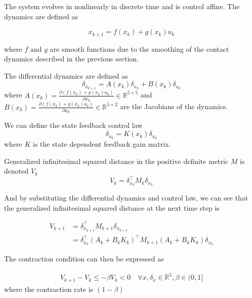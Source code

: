 \documentclass[journal]{IEEEtran}
\begin{document}
The system evolves in nonlinearly in discrete time and is control affine. The dynamics are defined as

\begin{equation}
    x_{k+1} = f(x_k) + g(x_k)u_k
\end{equation}

where $f$ and $g$ are smooth functions due to the smoothing of the contact dynamics described in the previous section.

The differential dynamics are defined as
\begin{equation}
    \delta_{x_{k+1}} = A(x_k)\delta_{x_k} + B(x_k)\delta_{u_k}
\end{equation}
where $A(x_k) = \frac{\partial (f(x_k) + g(x_k)u_k)}{\partial x_k} \in \mathbb{R}^{5 \times 5}$ and $B(x_k) = \frac{\partial (f(x_k) + g(x_k)u_k)}{\partial u_k} \in \mathbb{R}^{5 \times 2}$ are the Jacobians of the dynamics.

We can define the state feedback control law
\begin{equation}
	\label{eq:delta_control_law}
    \delta_{u_k} = K(x_k)\delta_{x_k}
\end{equation}
where $K$ is the state dependent feedback gain matrix.

Generalized infinitesimal squared distance in the positive definite metric $M$ is denoted $V_k$
\begin{equation}
    V_k = \delta^\top_{x_k} M_{k} \delta_{x_k}
\end{equation}

And by substituting the differential dynamics and control law, we can see that the generalized infinitesimal squared distance at the next time step is

\begin{equation}
	\begin{aligned}
	V_{k+1} & = \delta^\top_{x_{k+1}} M_{k+1} \delta_{x_{k+1}} \\
	& = \delta^\top_{x_k} (A_k + B_k K_k)^\top M_{k+1} (A_k + B_k K_k)\delta_{x_k}
	\end{aligned}
\end{equation}

The contraction condition can then be expressed as

\begin{equation}
	\begin{aligned}
	V_{k+1} - V_k \leq 
	- \beta V_k <
	0 \quad \forall x, \delta_x \in \mathbb{R}^5, \beta \in (0,1]
	\end{aligned}
\end{equation}
where the contraction rate is $(1-\beta)$
\end{document}
